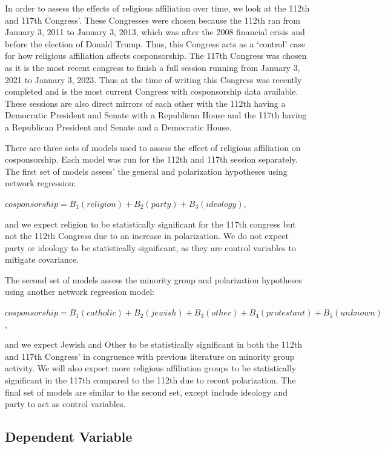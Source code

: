 \documentclass[Royal,times,sageh]{sagej}
\begin{document}
In order to assess the effects of religious affiliation over time, we
look at the 112th and 117th Congress'. These Congresses were chosen
because the 112th ran from January 3, 2011 to January 3, 2013, which was
after the 2008 financial crisis and before the election of Donald Trump.
Thus, this Congress acts as a `control' case for how religious
affiliation affects cosponsorship. The 117th Congress was chosen as it
is the most recent congress to finish a full session running from
January 3, 2021 to January 3, 2023. Thus at the time of writing this
Congress was recently completed and is the most current Congress with
cosponsorship data available. These sessions are also direct mirrors of
each other with the 112th having a Democratic President and Senate with
a Republican House and the 117th having a Republican President and
Senate and a Democratic House.

There are three sets of models used to assess the effect of religious
affiliation on cosponsorship. Each model was run for the 112th and 117th
session separately. The first set of models assess' the general and
polarization hypotheses using network regression:

\(cosponsorship = B_1(religion) + B_2(party) + B_3(ideology)\),

and we expect religion to be statistically significant for the 117th
congress but not the 112th Congress due to an increase in polarization.
We do not expect party or ideology to be statistically significant, as
they are control variables to mitigate covariance.

The second set of models assess the minority group and polarization
hypotheses using another network regression model:

\(cosponsorship = B_1(catholic) + B_2(jewish) + B_3(other) + B_4(protestant) + B_5(unknown)\),

and we expect Jewish and Other to be statistically significant in both
the 112th and 117th Congress' in congruence with previous literature on
minority group activity. We will also expect more religious affiliation
groups to be statistically significant in the 117th compared to the
112th due to recent polarization. The final set of models are similar to
the second set, except include ideology and party to act as control
variables.

\hypertarget{dependent-variable}{%
\subsection{Dependent Variable}\label{dependent-variable}}
\end{document}
